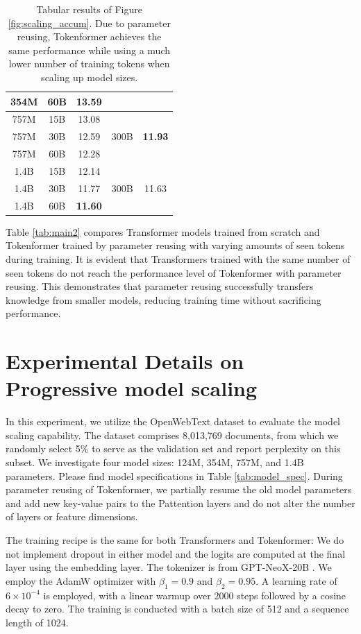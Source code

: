 \documentclass{article} %
\newcommand{\ourmethod}{Tokenformer\xspace}
\begin{document}
\begin{table}[ht]
\begin{minipage}{0.49\textwidth}
{\begin{tabular}{ccccc}
354M & 60B & {13.59} &  &  \\ \midrule
757M & 15B & 13.08 & \multirow{3}{*}{300B} & \multirow{3}{*}{\textbf{11.93}} \\
757M & 30B & 12.59 &  &  \\
757M & 60B & {12.28} &  &  \\ \midrule
1.4B & 15B & 12.14 & \multirow{3}{*}{300B} & \multirow{3}{*}{11.63} \\
1.4B & 30B & 11.77 &  &  \\
1.4B & 60B & \textbf{11.60} &  &  \\ \bottomrule
\end{tabular}
}
\caption{
Tabular results of Figure \ref{fig:scaling_accum}.
Due to parameter reusing, {\ourmethod} achieves the same performance while using a much lower number of training tokens when scaling up model sizes.
}
\label{tab:main1}
\end{minipage}
\end{table}

Table \ref{tab:main2} compares Transformer models trained from scratch and \ourmethod trained by parameter reusing with varying amounts of seen tokens during training. It is evident that Transformers trained with the same number of seen tokens do not reach the performance level of \ourmethod with parameter reusing. This demonstrates that parameter reusing successfully transfers knowledge from smaller models, reducing training time without sacrificing performance.

\section{Experimental Details on Progressive model scaling}
In this experiment, we utilize the OpenWebText dataset \citep{Gokaslan2019OpenWeb} to evaluate the model scaling capability. 
The dataset comprises 8,013,769 documents, from which we randomly select 5\% to serve as the validation set and report perplexity on this subset. 
We investigate four model sizes: 124M, 354M, 757M, and 1.4B parameters. 
Please find model specifications in Table \ref{tab:model_spec}.
During parameter reusing of \ourmethod, we partially resume the old model parameters and add new key-value pairs to the Pattention layers and do not alter the number of layers or feature dimensions.




The training recipe is the same for both Transformers and \ourmethod:
We do not implement dropout in either model and the logits are computed at the final layer using the embedding layer. 
The tokenizer is from GPT-NeoX-20B \citep{black2022gpt}.
We employ the AdamW optimizer \citep{loshchilov2017decoupled}  with $\beta_1=0.9$ and $\beta_2=0.95$.
A learning rate of $6 \times 10^{-4}$ is employed, with a linear warmup over 2000 steps followed by a cosine decay to zero. 
The training is conducted with a batch size of 512 and a sequence length of 1024. 
\end{document}
